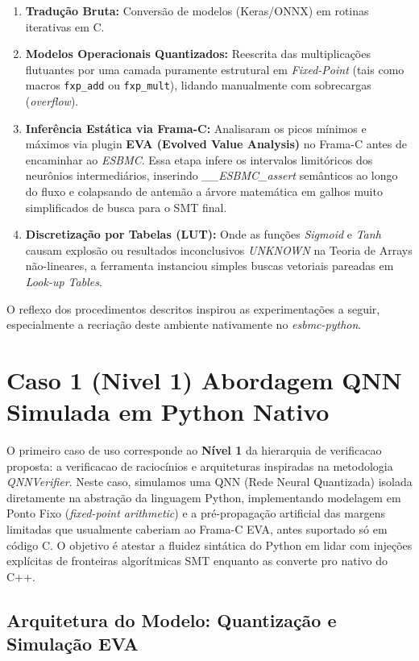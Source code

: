 \begin{enumerate}
    \item \textbf{Tradução Bruta:}  Conversão de modelos (Keras/ONNX) em rotinas iterativas em C.
    \item \textbf{Modelos Operacionais Quantizados:} Reescrita das multiplicações flutuantes por uma camada puramente estrutural em \textit{Fixed-Point} (tais como macros \texttt{fxp\_add} ou \texttt{fxp\_mult}), lidando manualmente com sobrecargas (\textit{overflow}).
    \item \textbf{Inferência Estática via Frama-C:} Analisaram os picos mínimos e máximos via plugin \textbf{EVA (Evolved Value Analysis)} no Frama-C antes de encaminhar ao \textit{ESBMC}. Essa etapa infere os intervalos limitóricos dos neurônios intermediários, inserindo \textit{\_\_ESBMC\_assert} semânticos ao longo do fluxo e colapsando de antemão a árvore matemática em galhos muito simplificados de busca para o SMT final.
    \item \textbf{Discretização por Tabelas (LUT):} Onde as funções \textit{Sigmoid} e \textit{Tanh} causam explosão ou resultados inconclusivos \textit{UNKNOWN} na Teoria de Arrays não-lineares, a ferramenta instanciou simples buscas vetoriais pareadas em \textit{Look-up Tables}.
\end{enumerate}

O reflexo dos procedimentos descritos inspirou as experimentações a seguir, especialmente a recriação deste ambiente nativamente no \textit{esbmc-python}.

\section{Caso 1 (Nivel 1) Abordagem QNN Simulada em Python Nativo}

O primeiro caso de uso corresponde ao \textbf{N\'ivel 1} da hierarquia de verificacao proposta: a verificacao de raciocínios e arquiteturas inspiradas na metodologia \textit{QNNVerifier}. Neste caso, simulamos uma QNN (Rede Neural Quantizada) isolada diretamente na abstração da linguagem Python, implementando modelagem em Ponto Fixo (\textit{fixed-point arithmetic}) e a pré-propagação artificial das margens limitadas que usualmente caberiam ao Frama-C EVA, antes suportado só em código C. O objetivo é atestar a fluidez sintática do Python em lidar com injeções explícitas de fronteiras algorítmicas SMT enquanto as converte pro nativo do C++.

\subsection{Arquitetura do Modelo: Quantização e Simulação EVA}

